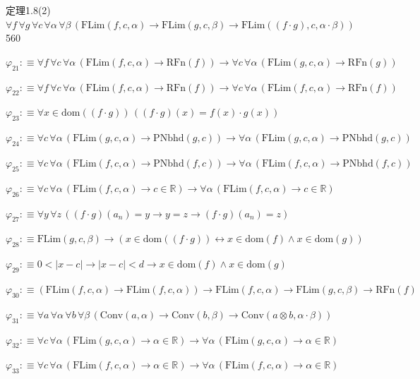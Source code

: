 \begin{fullproof}{定理1.8(2)}{$\forall f\,\forall g\,\forall c\,\forall \alpha\,\forall \beta\,(\mathrm{FLim}(f,c,\alpha) \to \mathrm{FLim}(g,c,\beta) \to \mathrm{FLim}((f \cdot g),c,\alpha \cdot \beta))$}{560}
\begin{abbrevlist}
\item $\varphi_{21} :\equiv \forall f\,\forall c\,\forall \alpha\,(\mathrm{FLim}(f,c,\alpha) \to \mathrm{RFn}(f)) \to \forall c\,\forall \alpha\,(\mathrm{FLim}(g,c,\alpha) \to \mathrm{RFn}(g))$
\item $\varphi_{22} :\equiv \forall f\,\forall c\,\forall \alpha\,(\mathrm{FLim}(f,c,\alpha) \to \mathrm{RFn}(f)) \to \forall c\,\forall \alpha\,(\mathrm{FLim}(f,c,\alpha) \to \mathrm{RFn}(f))$
\item $\varphi_{23} :\equiv \forall x \in \mathrm{dom}((f \cdot g))\,((f \cdot g)(x) = f(x) \cdot g(x))$
\item $\varphi_{24} :\equiv \forall c\,\forall \alpha\,(\mathrm{FLim}(g,c,\alpha) \to \mathrm{PNbhd}(g,c)) \to \forall \alpha\,(\mathrm{FLim}(g,c,\alpha) \to \mathrm{PNbhd}(g,c))$
\item $\varphi_{25} :\equiv \forall c\,\forall \alpha\,(\mathrm{FLim}(f,c,\alpha) \to \mathrm{PNbhd}(f,c)) \to \forall \alpha\,(\mathrm{FLim}(f,c,\alpha) \to \mathrm{PNbhd}(f,c))$
\item $\varphi_{26} :\equiv \forall c\,\forall \alpha\,(\mathrm{FLim}(f,c,\alpha) \to c \in \mathbb{R}) \to \forall \alpha\,(\mathrm{FLim}(f,c,\alpha) \to c \in \mathbb{R})$
\item $\varphi_{27} :\equiv \forall y\,\forall z\,((f \cdot g)(a_{n}) = y \to y = z \to (f \cdot g)(a_{n}) = z)$
\item $\varphi_{28} :\equiv \mathrm{FLim}(g,c,\beta) \to (x \in \mathrm{dom}((f \cdot g)) \leftrightarrow x \in \mathrm{dom}(f) \land x \in \mathrm{dom}(g))$
\item $\varphi_{29} :\equiv 0 < \lvert x - c \rvert \to \lvert x - c \rvert < d \to x \in \mathrm{dom}(f) \land x \in \mathrm{dom}(g)$
\item $\varphi_{30} :\equiv (\mathrm{FLim}(f,c,\alpha) \to \mathrm{FLim}(f,c,\alpha)) \to \mathrm{FLim}(f,c,\alpha) \to \mathrm{FLim}(g,c,\beta) \to \mathrm{RFn}(f)$
\item $\varphi_{31} :\equiv \forall a\,\forall \alpha\,\forall b\,\forall \beta\,(\mathrm{Conv}(a,\alpha) \to \mathrm{Conv}(b,\beta) \to \mathrm{Conv}(a \otimes b,\alpha \cdot \beta))$
\item $\varphi_{32} :\equiv \forall c\,\forall \alpha\,(\mathrm{FLim}(g,c,\alpha) \to \alpha \in \mathbb{R}) \to \forall \alpha\,(\mathrm{FLim}(g,c,\alpha) \to \alpha \in \mathbb{R})$
\item $\varphi_{33} :\equiv \forall c\,\forall \alpha\,(\mathrm{FLim}(f,c,\alpha) \to \alpha \in \mathbb{R}) \to \forall \alpha\,(\mathrm{FLim}(f,c,\alpha) \to \alpha \in \mathbb{R})$

\end{abbrevlist}
\end{fullproof}
